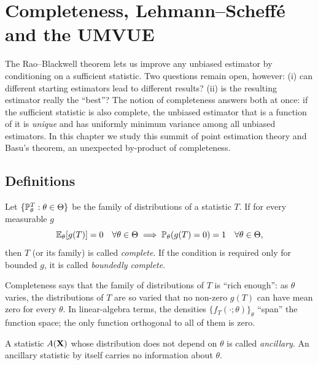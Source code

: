 \documentclass[main.tex]{subfiles}
\begin{document}
\chapter{Completeness, Lehmann--Scheffé and the UMVUE}\label{ch:tamlik}

The Rao--Blackwell theorem lets us improve any unbiased estimator by conditioning on a sufficient statistic. Two questions remain open, however: (i) can different starting estimators lead to different results? (ii) is the resulting estimator really the ``best''? The notion of completeness answers both at once: if the sufficient statistic is also complete, the unbiased estimator that is a function of it is \emph{unique} and has uniformly minimum variance among all unbiased estimators. In this chapter we study this summit of point estimation theory and Basu's theorem, an unexpected by-product of completeness.

\section{Definitions}

\begin{definition}\label{def:tam}
Let $\{\P_\theta^T:\theta\in\Theta\}$ be the family of distributions of a statistic $T$. If for every measurable $g$
\[
\E_\theta[g(T)] = 0\quad \forall \theta\in\Theta \implies \P_\theta(g(T) = 0) = 1\quad\forall\theta\in\Theta,
\]
then $T$ (or its family) is called \emph{complete}. If the condition is required only for bounded $g$, it is called \emph{boundedly complete}.
\end{definition}

\begin{remark}[Interpretation]
Completeness says that the family of distributions of $T$ is ``rich enough'': as $\theta$ varies, the distributions of $T$ are so varied that no non-zero $g(T)$ can have mean zero for every $\theta$. In linear-algebra terms, the densities $\{f_T(\cdot;\theta)\}_\theta$ ``span'' the function space; the only function orthogonal to all of them is zero.
\end{remark}

\begin{definition}
A statistic $A(\X)$ whose distribution does not depend on $\theta$ is called \emph{ancillary}. An ancillary statistic by itself carries no information about $\theta$.
\end{definition}
\end{document}
